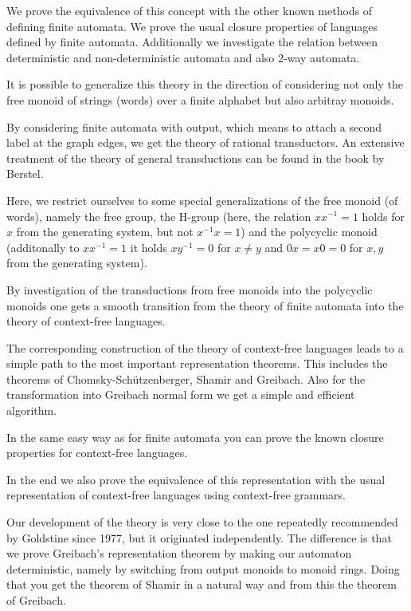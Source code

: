 We prove the equivalence of this concept with the other known methods of
defining finite automata. We prove the usual closure properties of languages
defined by finite automata. Additionally we investigate the relation between
deterministic and non-deterministic automata and also 2-way automata.

It is possible to generalize this theory in the direction of considering not
only the free monoid of strings (words) over a finite alphabet but also arbitray
monoids.

By considering finite automata with output, which means to attach a second label
at the graph edges, we get the theory of rational transductors. An extensive
treatment of the theory of general transductions can be found in the book by
Berstel.

Here, we restrict ourselves to some special generalizations of the free monoid
(of words), namely the free group, the H-group (here, the relation $x x^{-1} =
1$ holds for $x$ from the generating system, but not $x^{-1} x = 1$) and the
polycyclic monoid (additonally to $x x^{-1} = 1$ it holds $x y^{-1} = 0$ for
$x \neq y$ and $0 x = x 0 = 0$ for $x,y$ from the generating system).

By investigation of the transductions from free monoids into the polycyclic
monoids one gets a smooth transition from the theory of finite automata into the
theory of context-free languages.

The corresponding construction of the theory of context-free languages leads to
a simple path to the most important representation theorems. This includes the
theorems of Chomsky-Schützenberger, Shamir and Greibach. Also for the
transformation into Greibach normal form we get a simple and efficient
algorithm.

In the same easy way as for finite automata you can prove the known closure
properties for context-free languages.

In the end we also prove the equivalence of this representation with the usual
representation of context-free languages using context-free grammars.

Our development of the theory is very close to the one repeatedly recommended by
Goldstine since 1977, but it originated independently. The difference is that we
prove Greibach's representation theorem by making our automaton deterministic,
namely by switching from output monoids to monoid rings. Doing that you get the
theorem of Shamir in a natural way and from this the theorem of Greibach.

